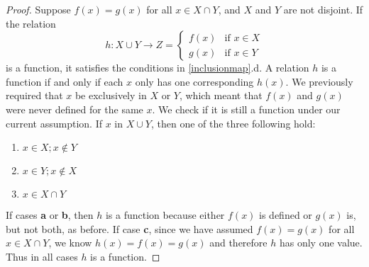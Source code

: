 \documentclass[../../main.tex]{subfiles}
\begin{document}
\begin{enumerate}
    \begin{proof}
       Suppose $f(x)=g(x)$ for all $x \in X \cap Y$, and $X$ and $Y$ are not disjoint. If the relation
        \begin{equation*}
            h: X \cup Y \to Z =
            \begin{cases}
                f(x) & \text{if } x \in X \\
                g(x) & \text{if } x \in Y
            \end{cases}
        \end{equation*}
        is a function, it satisfies the conditions in \ref*{inclusionmap}.d. A relation $h$ is a function if and only if each $x$ only has one corresponding $h(x)$. We previously required that $x$ be exclusively in $X$ or $Y$, which meant that $f(x)$ and $g(x)$ were never defined for the same $x$. We check if it is still a function under our current assumption. If $x$ in $X \cup Y$, then one of the three following hold:
        \begin{enumerate}
            \item $x \in X; x \notin Y$
            \item $x \in Y; x \notin X$
            \item $x \in X \cap Y$
        \end{enumerate}
        If cases \textbf{a} or \textbf{b}, then $h$ is a function because either $f(x)$ is defined or $g(x)$ is, but not both, as before. If case \textbf{c}, since we have assumed $f(x) = g(x)$ for all $x \in X \cap Y$, we know $h(x)=f(x)=g(x)$ and therefore $h$ has only one value. Thus in all cases $h$ is a function.
    \end{proof}
\end{enumerate}
        
\end{document}
